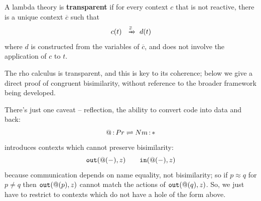 \documentclass{article}
\begin{document}


\newpage

\begin{definition}
    A lambda theory is \textbf{transparent} if for every context $c$ that is not reactive, there is a unique context $\overline{c}$ such that
    \[c(t) \xr{\overline{c}} d(t)\]
    where $d$ is constructed from the variables of $\overline{c}$, and does not involve the application of $c$ to $t$.
\end{definition}

The rho calculus is transparent, and this is key to its coherence; below we give a direct proof of congruent bisimilarity, without reference to the broader framework being developed.

There's just one caveat -- reflection, the ability to convert code into data and back:
\[@\,{:}\, Pr\rightleftharpoons Nm\,{:}\, \ast\]
introduces contexts which cannot preserve bisimilarity:
\[\mathtt{out}(@(-),z) \qquad \mathtt{in}(@(-),z)\]
because communication depends on name equality, not bisimilarity; so if $p\approx q$ for $p\neq q$ then $\mathtt{out}(@(p),z)$ cannot match the actions of $\mathtt{out}(@(q),z)$. 
So, we just have to restrict to contexts which do not have a hole of the form above.
\end{document}
